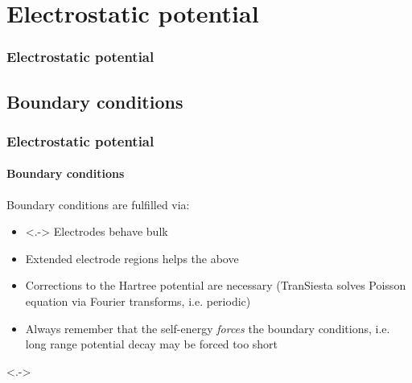 \section{Electrostatic potential}

\begin{framenologo}
  \frametitle{Electrostatic potential}
  \tableofcontents[currentsection]
\end{framenologo}

\subsection{Boundary conditions}

\begin{frame}
  \frametitle{Electrostatic potential}
  \framesubtitle{Boundary conditions}

  Boundary conditions are fulfilled via:
  \begin{itemize}[<+->]
    \item<.-> Electrodes behave bulk

    \item Extended electrode regions helps the above

    \item Corrections to the Hartree potential are necessary (TranSiesta solves Poisson
    equation via Fourier transforms, i.e. periodic)

    \item Always remember that the self-energy \emph{forces} the boundary conditions,
    i.e. long range potential decay may be forced too short

  \end{itemize}

  \uncover<.->{
  \begin{center}

\end{center}}
\end{frame}
